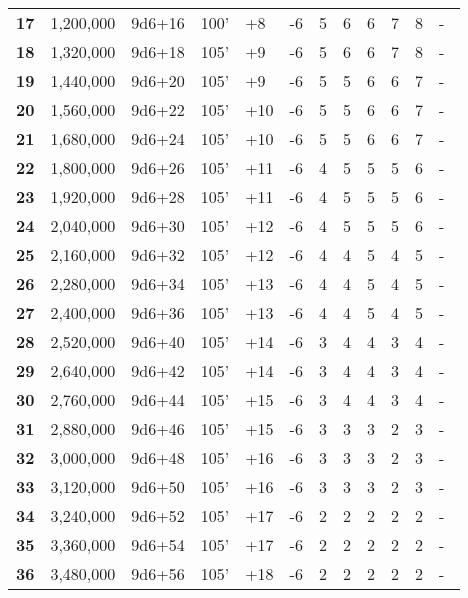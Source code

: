 \begin {table}[H]
\begin{tabularx}{\columnwidth}{>{\bfseries}ccM{.25in}cM{.31in}M{.36in}M{.51in}M{.25in}M{.43in}M{.32in}M{.45in}Y}
		17 & 1,200,000 & 9d6+16 & 100’ & +8 & -6 & 5 & 6 & 6 & 7 & 8 & -\\
		18 & 1,320,000 & 9d6+18 & 105’ & +9 & -6 & 5 & 6 & 6 & 7 & 8 & -\\
		19 & 1,440,000 & 9d6+20 & 105’ & +9 & -6 & 5 & 5 & 6 & 6 & 7 & -\\
		20 & 1,560,000 & 9d6+22 & 105’ & +10 & -6 & 5 & 5 & 6 & 6 & 7 & -\\
		21 & 1,680,000 & 9d6+24 & 105’ & +10 & -6 & 5 & 5 & 6 & 6 & 7 & -\\
		22 & 1,800,000 & 9d6+26 & 105’ & +11 & -6 & 4 & 5 & 5 & 5 & 6 & -\\
		23 & 1,920,000 & 9d6+28 & 105’ & +11 & -6 & 4 & 5 & 5 & 5 & 6 & -\\
		24 & 2,040,000 & 9d6+30 & 105’ & +12 & -6 & 4 & 5 & 5 & 5 & 6 & -\\
		25 & 2,160,000 & 9d6+32 & 105’ & +12 & -6 & 4 & 4 & 5 & 4 & 5 & -\\
		26 & 2,280,000 & 9d6+34 & 105’ & +13 & -6 & 4 & 4 & 5 & 4 & 5 & -\\
		27 & 2,400,000 & 9d6+36 & 105’ & +13 & -6 & 4 & 4 & 5 & 4 & 5 & -\\
		28 & 2,520,000 & 9d6+40 & 105’ & +14 & -6 & 3 & 4 & 4 & 3 & 4 & -\\
		29 & 2,640,000 & 9d6+42 & 105’ & +14 & -6 & 3 & 4 & 4 & 3 & 4 & -\\
		30 & 2,760,000 & 9d6+44 & 105’ & +15 & -6 & 3 & 4 & 4 & 3 & 4 & -\\
		31 & 2,880,000 & 9d6+46 & 105’ & +15 & -6 & 3 & 3 & 3 & 2 & 3 & -\\
		32 & 3,000,000 & 9d6+48 & 105’ & +16 & -6 & 3 & 3 & 3 & 2 & 3 & -\\
		33 & 3,120,000 & 9d6+50 & 105’ & +16 & -6 & 3 & 3 & 3 & 2 & 3 & -\\
		34 & 3,240,000 & 9d6+52 & 105’ & +17 & -6 & 2 & 2 & 2 & 2 & 2 & -\\
		35 & 3,360,000 & 9d6+54 & 105’ & +17 & -6 & 2 & 2 & 2 & 2 & 2 & -\\
		36 & 3,480,000 & 9d6+56 & 105’ & +18 & -6 & 2 & 2 & 2 & 2 & 2 & -\
  \end {tabularx}
\end {table}
\newpage
